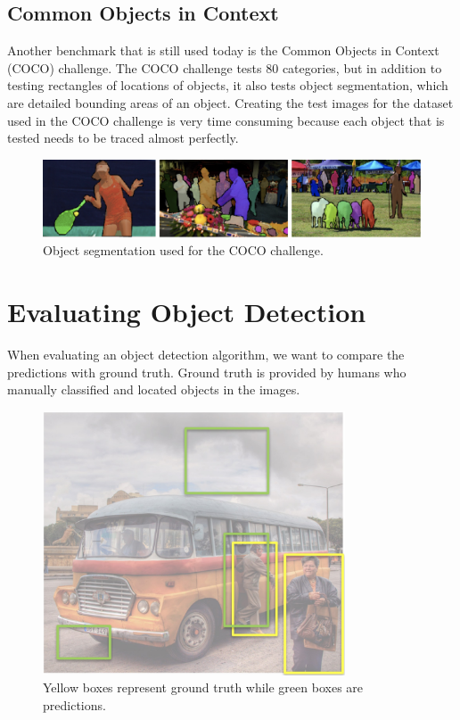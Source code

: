 \documentclass{article}
\begin{document}
\subsection{Common Objects in Context}
Another benchmark that is still used today is the Common Objects in Context (COCO) challenge. The COCO challenge tests 80 categories, but in addition to testing rectangles of locations of objects, it also tests object segmentation, which are detailed bounding areas of an object. Creating the test images for the dataset used in the COCO challenge is very time consuming because each object that is tested needs to be traced almost perfectly.

\begin{figure}[h]
	\includegraphics[width=\textwidth]{coco.png}
    \caption{Object segmentation used for the COCO challenge.}
\end{figure}

\pagebreak

\section{Evaluating Object Detection}

When evaluating an object detection algorithm, we want to compare the predictions with ground truth. Ground truth is provided by humans who manually classified and located objects in the images.

\begin{figure}[ht]
\centering
	\includegraphics[width=0.8\textwidth]{predict_truth.jpg}
    \caption{Yellow boxes represent ground truth while green boxes are predictions.}
\end{figure}
\end{document}
